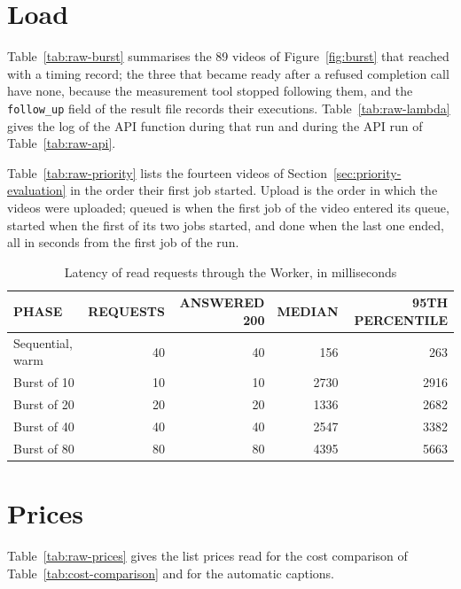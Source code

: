 \section{Load}

Table~\ref{tab:raw-burst} summarises the 89 videos of Figure~\ref{fig:burst} that reached
 with a timing record; the three that became ready after a refused completion call
have none, because the measurement tool stopped following them, and the \texttt{follow\_up} field
of the result file records their executions. Table~\ref{tab:raw-lambda} gives the log of the API function during that run and
during the API run of Table~\ref{tab:raw-api}.







Table~\ref{tab:raw-priority} lists the fourteen videos of Section~\ref{sec:priority-evaluation} in the
order their first job started. Upload is the order in which the videos were uploaded; queued is when
the first job of the video entered its queue, started when the first of its two jobs started, and
done when the last one ended, all in seconds from the first job of the run.



\begin{table}[H]
\centering
\caption{Latency of read requests through the Worker, in milliseconds}
\label{tab:api-load}
\small
\begin{tabular}{l r r r r}
\toprule
\textbf{PHASE} & \textbf{REQUESTS} & \textbf{ANSWERED 200} & \textbf{MEDIAN} & \textbf{95TH PERCENTILE} \\
\midrule
Sequential, warm & 40 & 40 & 156  & 263  \\
Burst of 10      & 10 & 10 & 2730 & 2916 \\
Burst of 20      & 20 & 20 & 1336 & 2682 \\
Burst of 40      & 40 & 40 & 2547 & 3382 \\
Burst of 80      & 80 & 80 & 4395 & 5663 \\
\bottomrule
\end{tabular}
\end{table}

\section{Prices}

Table~\ref{tab:raw-prices} gives the list prices read for the cost comparison of
Table~\ref{tab:cost-comparison} and for the automatic captions.


